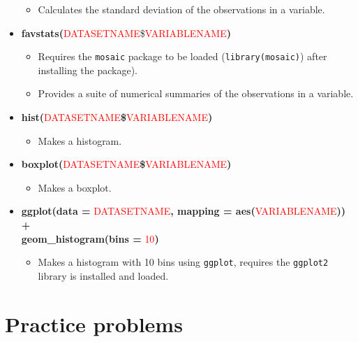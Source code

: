 \documentclass[
]{book}
\providecommand{\tightlist}{%
  \setlength{\itemsep}{0pt}\setlength{\parskip}{0pt}}
\begin{document}
\begin{itemize}
  \begin{itemize}
  \tightlist
  \item
    Calculates the standard deviation of the observations in a variable.
  \end{itemize}
\item
  \textbf{favstats(}\textcolor{red}{DATASETNAME}\$\textcolor{red}{VARIABLENAME}\textbf{)}

  \begin{itemize}
  \item
    Requires the \texttt{mosaic} package to be loaded (\texttt{library(mosaic)}) after
    installing the package).
  \item
    Provides a suite of numerical summaries of the observations in a variable.
  \end{itemize}
\item
  \textbf{hist(}\textcolor{red}{DATASETNAME}\textbf{\$}\textcolor{red}{VARIABLENAME}\textbf{)}

  \begin{itemize}
  \tightlist
  \item
    Makes a histogram. 
  \end{itemize}
\item
  \textbf{boxplot(}\textcolor{red}{DATASETNAME}\textbf{\$}\textcolor{red}{VARIABLENAME}\textbf{)}

  \begin{itemize}
  \tightlist
  \item
    Makes a boxplot. 
  \end{itemize}
\item
  \textbf{ggplot(data = }\textcolor{red}{DATASETNAME}\textbf{, mapping = aes(}\textcolor{red}{VARIABLENAME}\textbf{)) +\\
  geom\_histogram(bins = }\textcolor{red}{10}\textbf{)}

  \begin{itemize}
  \tightlist
  \item
    Makes a histogram with 10 bins using \texttt{ggplot}, requires the \texttt{ggplot2}
    library is installed and loaded. 
  \end{itemize}
\end{itemize}

\newpage

\hypertarget{section1-9}{%
\section{Practice problems}\label{section1-9}}
\end{document}
